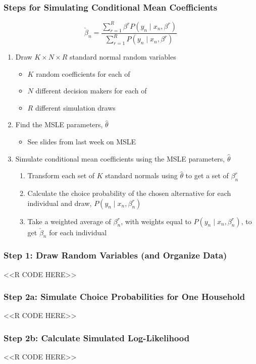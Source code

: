\documentclass{beamer}
\begin{document}
\begin{frame}\frametitle{Steps for Simulating Conditional Mean Coefficients}
    $$\check{\beta}_n = \frac{\sum_{r = 1}^R \beta^r P(y_n \mid x_n, \beta^r)}{\sum_{r = 1}^R P(y_n \mid x_n, \beta^r)}$$
    \begin{enumerate}
        \item Draw $K \times N \times R$ standard normal random variables
        \begin{itemize}
            \item $K$ random coefficients for each of
            \item $N$ different decision makers for each of
            \item $R$ different simulation draws
        \end{itemize}
        \item Find the MSLE parameters, $\hat{\theta}$
        \begin{itemize}
            \item See slides from last week on MSLE
        \end{itemize}
        \item Simulate conditional mean coefficients using the MSLE parameters, $\hat{\theta}$
        \begin{enumerate}
            \item Transform each set of $K$ standard normals using $\hat{\theta}$ to get a set of $\beta_n^r$
            \item Calculate the choice probability of the chosen alternative for each individual and draw, $P(y_n \mid x_n, \beta_n^r)$
            \item Take a weighted average of $\beta_n^r$, with weights equal to $P(y_n \mid x_n, \beta_n^r)$, to get $\check{\beta}_n$ for each individual
        \end{enumerate}
    \end{enumerate}
\end{frame}

\begin{frame}[fragile]\frametitle{Step 1: Draw Random Variables (and Organize Data)}
    <<R CODE HERE>>
\end{frame}

\begin{frame}[fragile]\frametitle{Step 2a: Simulate Choice Probabilities for One Household}
    <<R CODE HERE>>
\end{frame}

\begin{frame}[fragile]\frametitle{Step 2b: Calculate Simulated Log-Likelihood}
    <<R CODE HERE>>
\end{frame}
\end{document}
